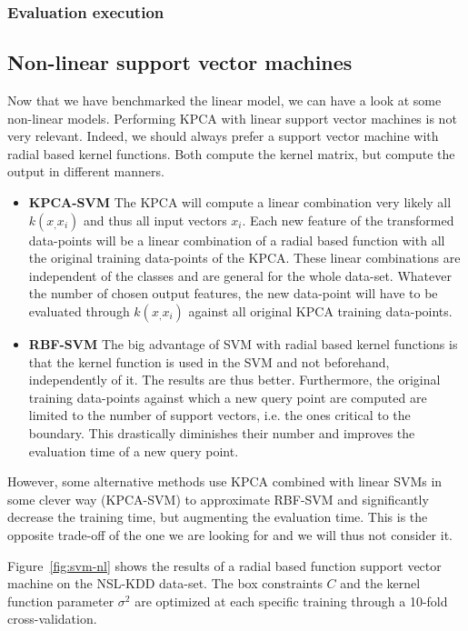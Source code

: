 \FloatBarrier
\subsubsection{Evaluation execution}

\subsection{Non-linear support vector machines}
Now that we have benchmarked the linear model, we can have a look at some non-linear models. Performing KPCA with linear support vector machines is not very relevant. Indeed, we should always prefer a support vector machine with radial based kernel functions. Both compute the kernel matrix, but compute the output in different manners. 
\begin{itemize}
    \item \textbf{KPCA-SVM} The KPCA will compute a linear combination very likely all $k(x_,x_i)$ and thus all input vectors $x_i$. Each new feature of the transformed data-points will be a linear combination of a radial based function with all the original training data-points of the KPCA. These linear combinations are independent of the classes and are general for the whole data-set. Whatever the number of chosen output features, the new data-point will have to be evaluated through $k(x_,x_i)$ against all original KPCA training data-points.
    \item \textbf{RBF-SVM} The big advantage of SVM with radial based kernel functions is that the kernel function is used in the SVM and not beforehand, independently of it. The results are thus better. Furthermore, the original training data-points against which a new query point are computed are limited to the number of support vectors, i.e. the ones critical to the boundary. This drastically diminishes their number and improves the evaluation time of a new query point.
\end{itemize}
However, some alternative methods use KPCA combined with linear SVMs in some clever way (KPCA-SVM) to approximate RBF-SVM and significantly decrease the training time, but augmenting the evaluation time. This is the opposite trade-off of the one we are looking for and we will thus not consider it.

Figure~\ref{fig:svm-nl} shows the results of a radial based function support vector machine on the NSL-KDD data-set. The box constraints $C$ and the kernel function parameter $\sigma^2$ are optimized at each specific training through a 10-fold cross-validation. 

